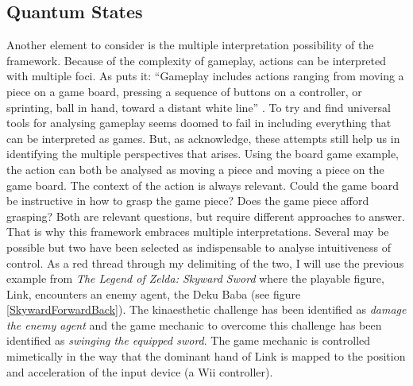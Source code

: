 \subsection{Quantum States}
Another element to consider is the multiple interpretation possibility of the framework. Because of the complexity of gameplay, actions can be interpreted with multiple foci. As  puts it: ``Gameplay includes actions ranging from moving a piece on a game board, pressing a sequence of buttons on a controller, or sprinting, ball in hand, toward a distant white line'' \cite[p. 8]{calleja}. To try and find universal tools for analysing gameplay seems doomed to fail in including everything that can be interpreted as games. But, as \cite{calleja} acknowledge, these attempts still help us in identifying the multiple perspectives that arises. Using the board game example, the action can both be analysed as moving a piece and moving a piece on the game board. The context of the action is always relevant. Could the game board be instructive in how to grasp the game piece? Does the game piece afford grasping? Both are relevant questions, but require different approaches to answer. That is why this framework embraces multiple interpretations. Several may be possible but two have been selected as indispensable to analyse intuitiveness of control. As a red thread through my delimiting of the two, I will use the previous example from \textit{The Legend of Zelda: Skyward Sword} \cite{skyward} where the playable figure, Link, encounters an enemy agent, the Deku Baba (see figure \ref{SkywardForwardBack}). The kinaesthetic challenge has been identified as \textit{damage the enemy agent} and the game mechanic to overcome this challenge has been identified as \textit{swinging the equipped sword}. The game mechanic is controlled mimetically in the way that the dominant hand of Link is mapped to the position and acceleration of the input device (a Wii controller).

